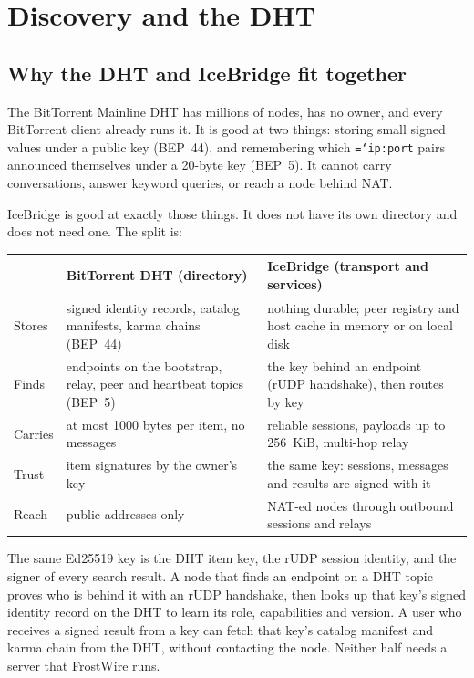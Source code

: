\documentclass[11pt,a4paper]{article}
\newcommand{\code}[1]{\texttt{\hyphenchar\font=`\-\relax #1}}
\DeclareRobustCommand{\_}{\origunderscore\allowbreak}
\begin{document}
\section{Discovery and the DHT}
\label{sec:discovery}

\subsection{Why the DHT and IceBridge fit together}
\label{sec:synergy}
The BitTorrent Mainline DHT has millions of nodes, has no owner, and every BitTorrent client
already runs it. It is good at two things: storing small signed values under a public key
(BEP~44), and remembering which \code{ip:port} pairs announced themselves under a 20-byte key
(BEP~5). It cannot carry conversations, answer keyword queries, or reach a node behind NAT.

IceBridge is good at exactly those things. It does not have its own directory and does not
need one. The split is:

\begin{center}\small
\begin{tabularx}{\textwidth}{lLL}
\toprule
 & BitTorrent DHT (directory) & IceBridge (transport and services)\\
\midrule
Stores & signed identity records, catalog manifests, karma chains (BEP~44) & nothing durable; peer registry and host cache in memory or on local disk\\
Finds & endpoints on the bootstrap, relay, peer and heartbeat topics (BEP~5) & the key behind an endpoint (rUDP handshake), then routes by key\\
Carries & at most 1000 bytes per item, no messages & reliable sessions, payloads up to 256~KiB, multi-hop relay\\
Trust & item signatures by the owner's key & the same key: sessions, messages and results are signed with it\\
Reach & public addresses only & NAT-ed nodes through outbound sessions and relays\\
\bottomrule
\end{tabularx}
\end{center}

The same Ed25519 key is the DHT item key, the rUDP session identity, and the signer of every
search result. A node that finds an endpoint on a DHT topic proves who is behind it with an
rUDP handshake, then looks up that key's signed identity record on the DHT to learn its role,
capabilities and version. A user who receives a signed result from a key can fetch that key's
catalog manifest and karma chain from the DHT, without contacting the node. Neither half
needs a server that FrostWire runs.
\end{document}
